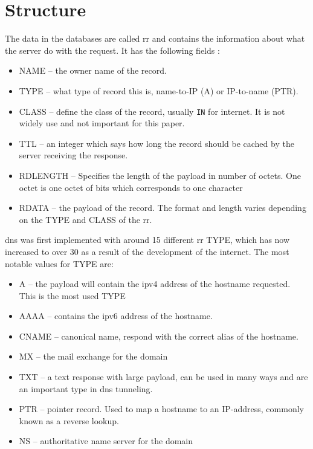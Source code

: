\section{Structure}
The data in the databases are called \Gls{rr} and contains the information about what the server do with the request. It has the following fields \cite{mockapetris1983domain}:
\begin{itemize} 
\item NAME -- the owner name of the record.
\item TYPE -- what type of record this is, name-to-IP (A) or IP-to-name (PTR).
\item CLASS -- define the class of the record, usually \texttt{IN} for internet. It is not widely use and not important for this paper.
\item TTL -- an integer which says how long the record should be cached by the server receiving the response.
\item RDLENGTH -- Specifies the length of the payload in number of octets. One octet is one octet of bits which corresponds to one character
\item RDATA -- the payload of the record. The format and length varies depending on the TYPE and CLASS of the \Gls{rr}.
\end{itemize}

\gls{dns} was first implemented with around 15 different \gls{rr} TYPE, which has now increased to over 30 \cite{farnham2013detecting} as a result of the development of the internet. The most notable values for TYPE are:

\begin{itemize}
\item A -- the payload will contain the ipv4 address of the hostname requested. This is the most used TYPE
\item AAAA -- contains the ipv6 address of the hostname.
\item CNAME -- canonical name, respond with the correct alias of the hostname.
\item MX -- the mail exchange for the domain
\item TXT -- a text response with large payload, can be used in many ways and are an important type in \gls{dns} tunneling.
\item PTR -- pointer record. Used to map a hostname to an IP-address, commonly known as a reverse lookup.
\item NS -- authoritative name server for the domain
\end{itemize}

